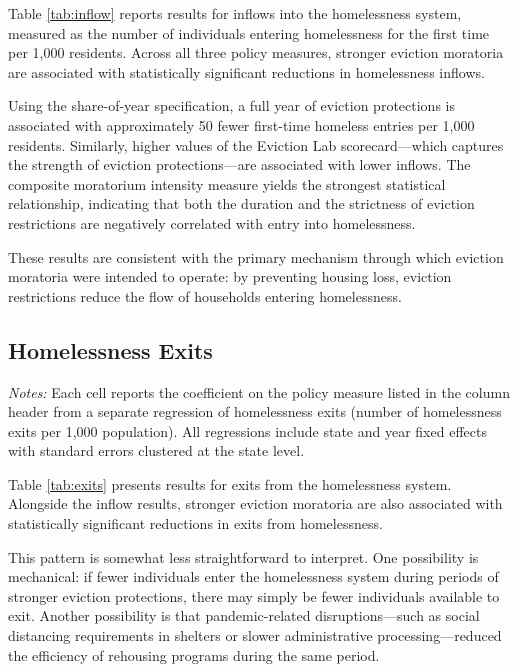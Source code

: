 \documentclass[12pt]{article}
\begin{document}
Table \ref{tab:inflow} reports results for inflows into the homelessness system, measured as the number of individuals entering homelessness for the first time per 1,000 residents. Across all three policy measures, stronger eviction moratoria are associated with statistically significant reductions in homelessness inflows. 

Using the share-of-year specification, a full year of eviction protections is associated with approximately 50 fewer first-time homeless entries per 1,000 residents. Similarly, higher values of the Eviction Lab scorecard—which captures the strength of eviction protections—are associated with lower inflows. The composite moratorium intensity measure yields the strongest statistical relationship, indicating that both the duration and the strictness of eviction restrictions are negatively correlated with entry into homelessness. 

These results are consistent with the primary mechanism through which eviction moratoria were intended to operate: by preventing housing loss, eviction restrictions reduce the flow of households entering homelessness.

\subsection{Homelessness Exits}

\begin{table}[H]
\centering
\begin{threeparttable}
\caption{Eviction Moratoria and Homelessness Exits}
\label{tab:exits}

\begin{tablenotes}[flushleft]
\footnotesize
\item \textit{Notes:} Each cell reports the coefficient on the policy measure listed in the column header from a separate regression of homelessness exits (number of homelessness exits per 1,000 population). All regressions include state and year fixed effects with standard errors clustered at the state level.
\end{tablenotes}
\end{threeparttable}
\end{table}

Table \ref{tab:exits} presents results for exits from the homelessness system. Alongside the inflow results, stronger eviction moratoria are also associated with statistically significant reductions in exits from homelessness. 

This pattern is somewhat less straightforward to interpret. One possibility is mechanical: if fewer individuals enter the homelessness system during periods of stronger eviction protections, there may simply be fewer individuals available to exit. Another possibility is that pandemic-related disruptions—such as social distancing requirements in shelters or slower administrative processing—reduced the efficiency of rehousing programs during the same period. 
\end{document}
